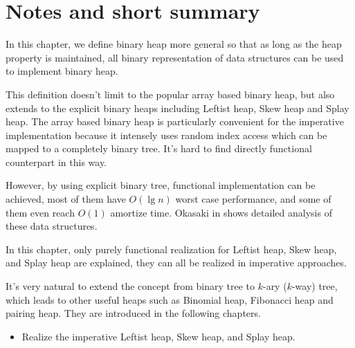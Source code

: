 \documentclass{article}
\begin{document}
\section{Notes and short summary}

In this chapter, we define binary heap more general
so that as long as the heap property is maintained, all binary
representation of data structures can be used to implement binary heap.

This definition doesn't limit to the popular array based binary
heap, but also extends to the explicit binary heaps including Leftist
heap, Skew heap and Splay heap. The array based binary heap
is particularly convenient for the imperative implementation
because it intensely uses random index access which can be mapped to
a completely binary tree. It's hard to find directly functional
counterpart in this way.

However, by using explicit binary tree, functional implementation
can be achieved, most of them have $O(\lg n)$ worst case
performance, and some of them even reach $O(1)$ amortize time.
Okasaki in \cite{okasaki-book} shows detailed analysis of these data
structures.

In this chapter, only purely functional realization for Leftist heap,
Skew heap, and Splay heap are explained, they can all be realized
in imperative approaches.

It's very natural to extend the concept from binary tree to
$k$-ary ($k$-way) tree, which leads to other useful heaps such as
Binomial heap, Fibonacci heap and pairing heap. They are introduced
in the following chapters.

\begin{Exercise}
\begin{itemize}
\item Realize the imperative Leftist heap, Skew heap, and Splay heap.
\end{itemize}
\end{Exercise}
\end{document}

